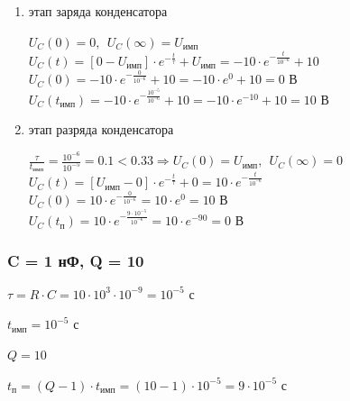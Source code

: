 \begin{enumerate}
\item этап заряда конденсатора

	$U_C(0) = 0,\ \ U_C(\infty) = U_\text{имп}$\\
	$U_C(t) = [0 - U_\text{имп}] \cdot e^{-\frac{t}{\tau}} + U_\text{имп} = -10 \cdot e^{-\frac{t}{10^{-6}}} + 10$\\
	$U_C(0) = -10 \cdot e^{-\frac{0}{10^{-6}}} + 10 = -10 \cdot e^0 + 10 = 0 \text{ В}$\\
	$U_C(t_\text{имп}) = -10 \cdot e^{-\frac{10^{-5}}{10^{-6}}} + 10 = -10 \cdot e^{-10} + 10 = 10 \text{ В}$

\item этап разряда конденсатора
	
	$\frac{\tau}{t_\text{имп}} = \frac{10^{-6}}{10^{-5}} = 0.1 < 0.33 \Rightarrow U_C(0) = U_\text{имп},\ \ U_C(\infty) = 0$\\
	$U_C(t) = [U_\text{имп} - 0] \cdot e^{-\frac{t}{\tau}} + 0 = 10 \cdot e^{-\frac{t}{10^{-6}}}$\\
	$U_C(0) = 10 \cdot e^{-\frac{0}{10^{-6}}} = 10 \cdot e^0 = 10 \text{ В}$\\
	$U_C(t_\text{п}) = 10 \cdot e^{-\frac{9 \cdot 10^{-5}}{10^{-6}}} = 10 \cdot e^{-90} = 0 \text{ В}$
\end{enumerate}

\subsubsection{C = 1 нФ, Q = 10}

$\tau = R \cdot C = 10 \cdot 10^3 \cdot 10^{-9} = 10^{-5} \text{ с}$

$t_\text{имп} = 10^{-5} \text{ с}$

$Q = 10$		

$t_\text{п} = (Q - 1) \cdot t_\text{имп} = (10 - 1) \cdot 10^{-5} = 9 \cdot 10^{-5} \text{ с}$

